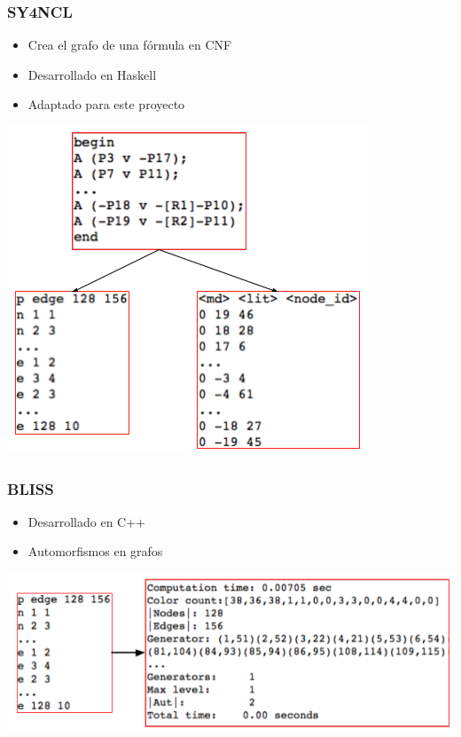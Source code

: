 \documentclass[compress,xcolor=dvipsnames]{beamer}
\theoremstyle{definition}
\begin{document}
\begin{frame}
	\frametitle{SY4NCL}
	\begin{itemize}[<+->]
		\item Crea el grafo de una fórmula en CNF
		\item Desarrollado en Haskell
		\item Adaptado para este proyecto
	\end{itemize}
		\onslide<+->
	\begin{center}
    	\includegraphics[scale=0.3225]{gfx/sy4ncl}
	\end{center}
\end{frame}

\begin{frame}
	\frametitle{BLISS}
	\begin{itemize}[<+->]
		\item Desarrollado en C++
		\item Automorfismos en grafos
	\end{itemize}
		\onslide<+->
	\begin{center}
    	\includegraphics[scale=0.3525]{gfx/bliss}
	\end{center}
\end{frame}
\end{document}
